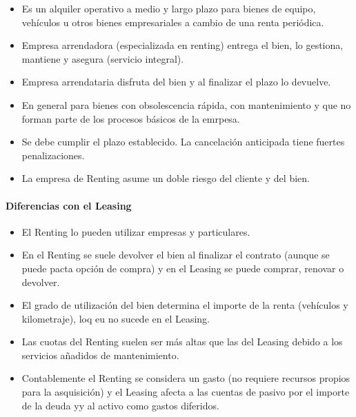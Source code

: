 \begin{itemize}
    \item Es un alquiler operativo a medio y largo plazo para bienes de equipo, vehículos u otros bienes empresariales a cambio de una renta periódica.
    \item Empresa arrendadora (especializada en renting) entrega el bien, lo gestiona, mantiene y asegura (servicio integral).
    \item Empresa arrendataria disfruta del bien y al finalizar el plazo lo devuelve.
    \item En general para bienes con obsolescencia rápida, con mantenimiento y que no forman parte de los procesos básicos de la emrpesa.
    \item Se debe cumplir el plazo establecido. La cancelación anticipada tiene fuertes penalizaciones.
    \item La empresa de Renting asume un doble riesgo del cliente y del bien.
\end{itemize}

\paragraph{Diferencias con el Leasing}
\begin{itemize}
    \item El Renting lo pueden utilizar empresas y particulares.
    \item En el Renting se suele devolver el bien al finalizar el contrato (aunque se puede pacta opción de compra) y en el Leasing se puede comprar, renovar o devolver.
    \item El grado de utilización del bien determina el importe de la renta (vehículos y kilometraje), loq eu no sucede en el Leasing.
    \item Las cuotas del Renting suelen ser más altas que las del Leasing debido a los servicios añadidos de mantenimiento.
    \item Contablemente el Renting se considera un gasto (no requiere recursos propios para la asquisición) y el Leasing afecta a las cuentas de pasivo por el importe de la deuda yy al activo como gastos diferidos.
\end{itemize}

